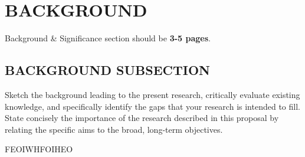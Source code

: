 \documentclass[../main/main]{subfiles}
\begin{document}
\section{BACKGROUND}
Background \& Significance section should be \textbf{3-5 pages}.

\subsection{BACKGROUND SUBSECTION}
\noindent Sketch the background leading to the present research, critically evaluate existing knowledge, and
specifically identify the gaps that your research is intended to fill. State concisely the importance of the
research described in this proposal by relating the specific aims to the broad, long-term objectives.


FEOIWHFOIHEO
\end{document}
